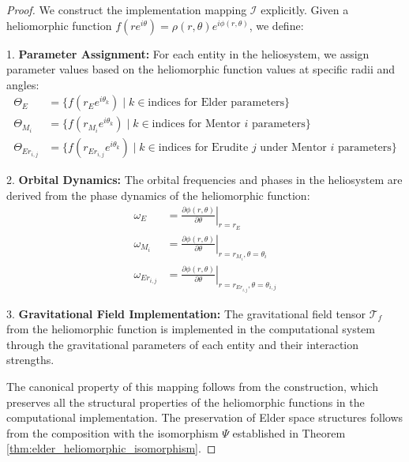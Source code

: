 \begin{proof}
We construct the implementation mapping $\mathcal{I}$ explicitly. Given a heliomorphic function $f(re^{i\theta}) = \rho(r,\theta)e^{i\phi(r,\theta)}$, we define:

1. \textbf{Parameter Assignment:} For each entity in the heliosystem, we assign parameter values based on the heliomorphic function values at specific radii and angles:
\begin{align}
\Theta_E &= \{f(r_E e^{i\theta_k}) \mid k \in \text{indices for Elder parameters}\} \\
\Theta_{M_i} &= \{f(r_{M_i} e^{i\theta_k}) \mid k \in \text{indices for Mentor $i$ parameters}\} \\
\Theta_{Er_{i,j}} &= \{f(r_{Er_{i,j}} e^{i\theta_k}) \mid k \in \text{indices for Erudite $j$ under Mentor $i$ parameters}\}
\end{align}

2. \textbf{Orbital Dynamics:} The orbital frequencies and phases in the heliosystem are derived from the phase dynamics of the heliomorphic function:
\begin{align}
\omega_E &= \left.\frac{\partial \phi(r,\theta)}{\partial \theta}\right|_{r=r_E} \\
\omega_{M_i} &= \left.\frac{\partial \phi(r,\theta)}{\partial \theta}\right|_{r=r_{M_i}, \theta=\theta_i} \\
\omega_{Er_{i,j}} &= \left.\frac{\partial \phi(r,\theta)}{\partial \theta}\right|_{r=r_{Er_{i,j}}, \theta=\theta_{i,j}}
\end{align}

3. \textbf{Gravitational Field Implementation:} The gravitational field tensor $\mathcal{T}_f$ from the heliomorphic function is implemented in the computational system through the gravitational parameters of each entity and their interaction strengths.

The canonical property of this mapping follows from the construction, which preserves all the structural properties of the heliomorphic functions in the computational implementation. The preservation of Elder space structures follows from the composition with the isomorphism $\Psi$ established in Theorem \ref{thm:elder_heliomorphic_isomorphism}.
\end{proof}

